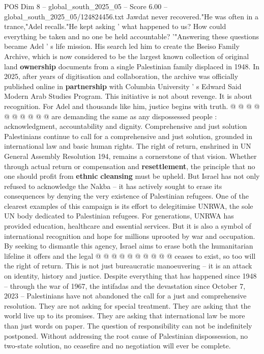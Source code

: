 \begin{textsample}{POS Dim 8 – global\_south\_2025\_05 – Score 6.00 – global\_south\_2025\_05/124824456.txt}
Jawdat never recovered."He was often in a trance,"Adel recalls."He kept asking ' what happened to us?
How could everything be taken and no one be held accountable? '"Answering these questions became Adel ' s life mission.
His search led him to create the Bseiso Family Archive, which is now considered to be the largest known collection of original land \textbf{ownership} documents from a single Palestinian family displaced in 1948.
In 2025, after years of digitisation and collaboration, the archive was officially published online in \textbf{partnership} with Columbia University ' s Edward Said Modern Arab Studies Program.
This initiative is not about revenge.
It is about recognition.
For Adel and thousands like him, justice begins with truth. @ @ @ @ @ @ @ @ @ @ are demanding the same as any dispossessed people : acknowledgment, accountability and dignity.
Comprehensive and just solution Palestinians continue to call for a comprehensive and just solution, grounded in international law and basic human rights.
The right of return, enshrined in UN General Assembly Resolution 194, remains a cornerstone of that vision.
Whether through actual return or compensation and \textbf{resettlement}, the principle that no one should profit from \textbf{ethnic} \textbf{cleansing} must be upheld.
But Israel has not only refused to acknowledge the Nakba -- it has actively sought to erase its consequences by denying the very existence of Palestinian refugees.
One of the clearest examples of this campaign is its effort to delegitimise UNRWA, the sole UN body dedicated to Palestinian refugees.
For generations, UNRWA has provided education, healthcare and essential services.
But it is also a symbol of international recognition and hope for millions uprooted by war and occupation.
By seeking to dismantle this agency, Israel aims to erase both the humanitarian lifeline it offers and the legal @ @ @ @ @ @ @ @ @ @ ceases to exist, so too will the right of return.
This is not just bureaucratic manoeuvering -- it is an attack on identity, history and justice.
Despite everything that has happened since 1948 -- through the war of 1967, the intifadas and the devastation since October 7, 2023 -- Palestinians have not abandoned the call for a just and comprehensive resolution.
They are not asking for special treatment.
They are asking that the world live up to its promises.
They are asking that international law be more than just words on paper.
The question of responsibility can not be indefinitely postponed.
Without addressing the root cause of Palestinian dispossession, no two-state solution, no ceasefire and no negotiation will ever be complete.

\end{textsample}
